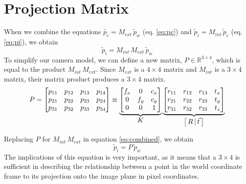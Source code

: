 \section{Projection Matrix} \label{sec:projection}

When we combine the equations $\widetilde{p_c} = M_{ext}\,\widetilde{p}_w$ (eq. \ref{eq:pc}) and $\widetilde{p}_i = M_{int}\,\widetilde{p}_c$ (eq. \ref{eq:pi}), we obtain
\begin{equation} \label{eq:combined}
    \widetilde{p}_{i} = M_{int}\,M_{ext}\,\widetilde{p}_{w}
\end{equation}
To simplify our camera model, we can define a new matrix, $P \in \mathbb{R}^{3 \times 4}$, which is equal to the product $M_{int}\,M_{ext}$. Since $M_{ext}$ is a $4 \times 4$ matrix and $M_{int}$ is a $3 \times 4$ matrix, their matrix product produces a $3 \times 4$ matrix.
\begin{equation}
    P=
    \begin{bmatrix}
        p_{11} & p_{12} & p_{13} & p_{14} \\
        p_{21} & p_{22} & p_{23} & p_{24} \\
        p_{31} & p_{32} & p_{33} & p_{34}
    \end{bmatrix}
    \equiv
    \underbrace{
        \begin{bmatrix}
            f_x & 0   & c_x \\
            0   & f_y & c_y \\
            0   & 0   & 1
        \end{bmatrix}
    }_{\mathlarger{K}}
    \underbrace{
        \begin{bmatrix}
            r_{11} & r_{12} & r_{13} & t_x \\
            r_{21} & r_{22} & r_{23} & t_y \\
            r_{31} & r_{32} & r_{33} & t_z \\
        \end{bmatrix}
    }_{\mathlarger{\left[\,R\,\vert\,\vec{t}\:\right]}}
\end{equation}

Replacing $P$ for $M_{int}\,M_{ext}$ in equation \ref{eq:combined}, we obtain
\begin{equation} \label{eq:project}
    \widetilde{p}_{i} = P\,\widetilde{p}_{w}
\end{equation}
The implications of this equation is very important, as it means that a $3 \times 4$ is sufficient in describing the relationship between a point in the world coordinate frame to its projection onto the image plane in pixel coordinates. 

